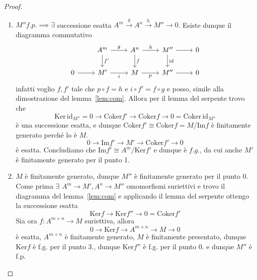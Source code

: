 \begin{proof}{}
\begin{enumerate}[label = \arabic*.]
    presentato. 
    \item \(M'' f.p. \implies \exists \) successione esatta \(A^{m} \overset{g}{\to } A^{n} \overset{h}{\to }M'' \to 0\). Esiste dunque il diagramma commutativo
\[\begin{tikzcd}
	 & A^{m} & A^{n} & M'' & 0 \\
	0 & M' & M & M'' & 0
	\arrow["g", from=1-2, to=1-3]
	\arrow["{f'}", from=1-2, to=2-2]
	\arrow["h", from=1-3, to=1-4]
	\arrow["f", from=1-3, to=2-3]
	\arrow[from=1-4, to=1-5]
	\arrow["{\mathrm{id}}", from=1-4, to=2-4]
	\arrow[from=2-1, to=2-2]
	\arrow["i"', from=2-2, to=2-3]
	\arrow["p"', from=2-3, to=2-4]
	\arrow[from=2-4, to=2-5]
\end{tikzcd}\]
    infatti voglio \(f, f'\) tale che \(p \circ f = h\) e \(i \circ f' = f \circ
    g\) e posso, simile alla dimostrazione del lemma~\ref{lem:com}.
    Allora per il lemma del serpente trovo che
    \[
      \mathrm{Ker} \, \mathrm{id}_{M''} = 0 \to \mathrm{Coker}f' \to \mathrm{Coker}f
      \to 0 = \mathrm{Coker}\, \mathrm{id}_{M''} 
    \]
    è una successione esatta, e dunque \(\mathrm{Coker}f' \cong \mathrm{Coker}f
    = M / \mathrm{Im} f\) è finitamente generato perché lo è \(M\).
    \[
    0 \to \mathrm{Im}f' \to M' \to \mathrm{Coker}f' \to 0
    \]
    è esatta. Concludiamo che \(\mathrm{Im} f' \cong A^{m} / \mathrm{Ker} f'\) e
    dunque è \(f.g.\), da cui anche \(M'\) è finitamente generato per il punto
    1.
    \item \(M\) è finitamente generato, dunque \(M''\) è finitamente generato
        per il punto 0. Come prima \(\exists\,\, A^{m} \to M', A^{n} \to M''\)
        omomorfismi suriettivi e trovo il diagramma del lemma~\ref{lem:com} e
        applicando il lemma del serpente ottengo la successione esatta
        \[
          \mathrm{Ker} f \to \mathrm{Ker}f'' \to 0 = \mathrm{Coker}f'
        \]
        Sia ora \(f: A^{m+n}\to M\) suriettiva, allora 
        \[
          0 \to \mathrm{Ker} f \to A^{m+n} \to M \to 0
        \]
        è esatta, \(A^{m+n}\) è finitamente generato, \(M\) è finitamente
        presentato, dunque \(\mathrm{Ker}f\) è f.g. per il punto 3., dunque 
        \(\mathrm{Ker}f''\) è f.g. per il punto 0. e dunque \(M''\) è f.p.
\end{enumerate}
\end{proof}

